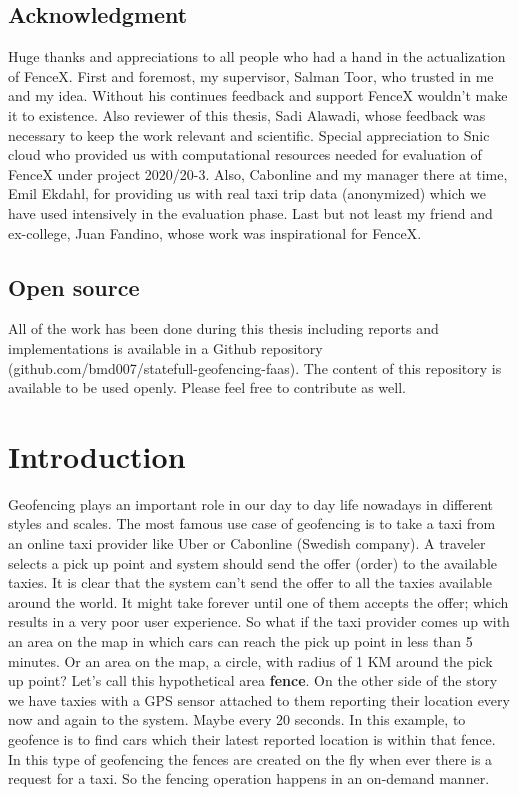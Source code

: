 \documentclass[a4]{report}
\begin{document}
    \section{Acknowledgment}
    Huge thanks and appreciations to all people who had a hand in the actualization of FenceX.
    First and foremost, my supervisor, Salman Toor, who trusted in me and my idea.
    Without his continues feedback and support FenceX wouldn't make it to existence.
    Also reviewer of this thesis, Sadi Alawadi, whose feedback was necessary to keep the work relevant and scientific.
    Special appreciation to Snic cloud who provided us with computational resources needed for evaluation of FenceX
    under project 2020/20-3.
    Also, Cabonline and my manager there at time,  Emil Ekdahl, for providing us with real taxi trip data
    (anonymized) which we have used intensively in the evaluation phase.
    Last but not least my friend and ex-college, Juan Fandino, whose work was inspirational for FenceX.


    \section{Open source}
    All of the work has been done during this thesis including reports and implementations is available in
    a Github repository (github.com/bmd007/statefull-geofencing-faas).
    The content of this repository is available to be used openly.
    Please feel free to contribute as well.


    \chapter{Introduction}
    Geofencing plays an important role in our day to day life nowadays in different styles and scales.
    The most famous use case of geofencing is to take a taxi from an online taxi provider like Uber or Cabonline
    (Swedish company).
    A traveler selects a pick up point and system should send the offer (order) to the available taxies.
    It is clear that the system can't send the offer to all the taxies available around the world.
    It might take forever until one of them accepts the offer;
    which results in a very poor user experience.
    So what if the taxi provider comes up with an area on the map in which cars can reach the pick up point in less
    than 5 minutes.
    Or an area on the map, a circle, with radius of 1 KM around the pick up point?
    Let's call this hypothetical area \textbf{fence}.
    On the other side of the story we have taxies with a GPS sensor attached to them reporting their location every
    now and again to the system.
    Maybe every 20 seconds.
    In this example, to geofence is to find cars which their latest reported location is within that fence.
    In this type of geofencing the fences are created on the fly when ever there is a request for a taxi.
    So the fencing operation happens in an on-demand manner.
\end{document}

